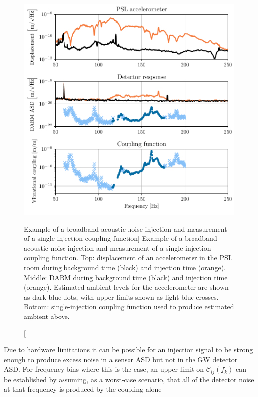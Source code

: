 \begin{figure}
	\centering
	\includegraphics{figures/noise-methods/cf-example.pdf}
	\caption
	[Example of a broadband acoustic noise injection and measurement of a single-injection coupling function]
	{
		Example of a broadband acoustic noise injection and measurement of a single-injection coupling function.
		Top: displacement of an accelerometer in the PSL room during background time (black) and injection time (orange).
		Middle: DARM during background time (black) and injection time (orange).
		Estimated ambient levels for the accelerometer are shown as dark blue dots, with upper limits shown as light blue crosses.
		Bottom: single-injection coupling function used to produce estimated ambient above.
		}
	\label{fig:cf-example}
\end{figure}

Due to hardware limitations it can be possible for an injection signal to be strong enough to produce excess noise in a sensor \ac{ASD} but not in the \ac{GW} detector \ac{ASD}.
For frequency bins where this is the case, an upper limit on $\mathcal{C}_{ij}(f_k)$ can be established by assuming, as a worst-case scenario, that all of the detector noise at that frequency is produced by the coupling alone

